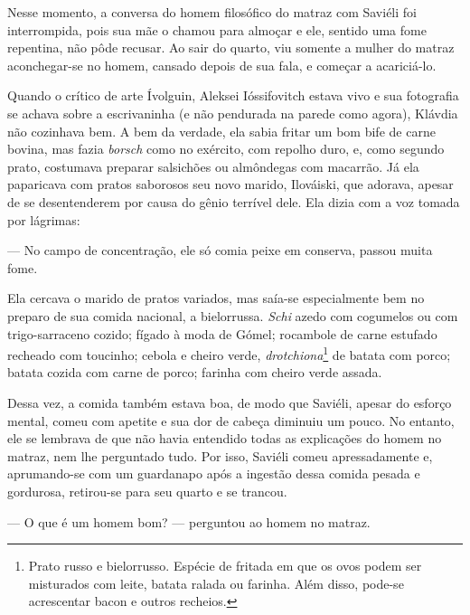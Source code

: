 Nesse momento, a conversa do homem filosófico do matraz com Saviéli foi
interrompida, pois sua mãe o chamou para almoçar e ele, sentido uma fome
repentina, não pôde recusar. Ao sair do quarto, viu somente a mulher do
matraz aconchegar-se no homem, cansado depois de sua fala, e começar a
acariciá-lo.

Quando o crítico de arte Ívolguin, Aleksei Ióssifovitch estava vivo e
sua fotografia se achava sobre a escrivaninha (e não pendurada na parede
como agora), Klávdia não cozinhava bem. A bem da verdade, ela sabia
fritar um bom bife de carne bovina, mas fazia \emph{borsch} como no
exército, com repolho duro, e, como segundo prato, costumava preparar
salsichões ou almôndegas com macarrão. Já ela paparicava com pratos
saborosos seu novo marido, Ilováiski, que adorava, apesar de se
desentenderem por causa do gênio terrível dele. Ela dizia com a voz
tomada por lágrimas:

--- No campo de concentração, ele só comia peixe em conserva, passou
muita fome.

Ela cercava o marido de pratos variados, mas saía-se especialmente bem
no preparo de sua comida nacional, a bielorrussa. \emph{Schi} azedo com
cogumelos ou com trigo-sarraceno cozido; fígado à moda de Gómel;
rocambole de carne estufado recheado com toucinho; cebola e cheiro
verde, \emph{drotchiona}\footnote{Prato russo e bielorrusso. Espécie de
  fritada em que os ovos podem ser misturados com leite, batata ralada
  ou farinha. Além disso, pode-se acrescentar bacon e outros recheios.}
de batata com porco; batata cozida com carne de porco; farinha com
cheiro verde assada.

Dessa vez, a comida também estava boa, de modo que Saviéli, apesar do
esforço mental, comeu com apetite e sua dor de cabeça diminuiu um pouco.
No entanto, ele se lembrava de que não havia entendido todas as
explicações do homem no matraz, nem lhe perguntado tudo. Por isso,
Saviéli comeu apressadamente e, aprumando-se com um guardanapo após a
ingestão dessa comida pesada e gordurosa, retirou-se para seu quarto e
se trancou.

--- O que é um homem bom? --- perguntou ao homem no matraz.

